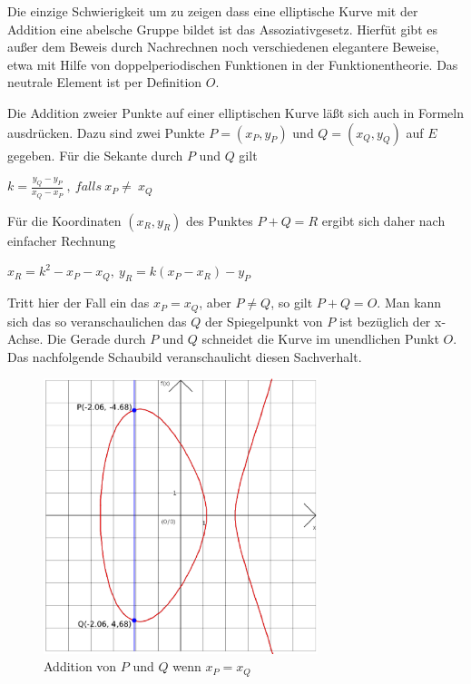 \documentclass[10pt, bigheadings]{scrartcl}
\begin{document}
Die einzige Schwierigkeit um zu zeigen dass eine elliptische Kurve mit der 
Addition eine abelsche Gruppe bildet ist das Assoziativgesetz. Hierfüt gibt es 
außer dem Beweis durch Nachrechnen noch verschiedenen elegantere Beweise, etwa
mit Hilfe von doppelperiodischen Funktionen in der Funktionentheorie. Das 
neutrale Element ist per Definition $O$. 

Die Addition zweier Punkte auf einer elliptischen Kurve läßt sich auch in 
Formeln ausdrücken. Dazu sind zwei Punkte $P=(x_P, y_P)$ und $Q=(x_Q, y_Q)$ auf 
$E$ gegeben. Für die Sekante durch $P$ und $Q$ gilt 
\begin{center}
$k=\frac{y_Q-y_P}{x_Q-x_P}\ ,\ falls\ x_P \neq\ x_Q$
\end{center}
Für die Koordinaten $(x_R, y_R)$  des Punktes $P+Q = R$ ergibt sich daher nach 
einfacher Rechnung
\begin{center}
$x_R = k^2 - x_P - x_Q,\ y_R = k(x_P - x_R)-y_P$
\end{center}
Tritt hier der Fall ein das $x_P = x_Q$, aber $P\neq Q$, so gilt $P+Q=O$. Man
kann sich das so veranschaulichen das $Q$ der Spiegelpunkt von $P$ ist bezüglich
der x-Achse. Die Gerade durch $P$ und $Q$ schneidet die Kurve im unendlichen 
Punkt $O$. Das nachfolgende Schaubild veranschaulicht diesen Sachverhalt.
\begin{figure}[ht]
\begin{center}
\includegraphics[width=8cm]{ec-3.eps}
\caption{Addition von $P$ und $Q$ wenn $x_P = x_Q$}
\end{center}
\end{figure}
\end{document}
